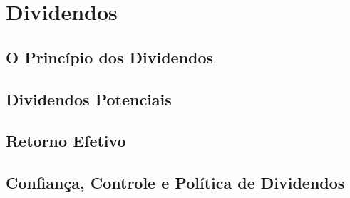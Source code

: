 \chapter{Dividendos}
\section{O Princípio dos Dividendos}

\section{Dividendos Potenciais}

\section{Retorno Efetivo}

\section{Confiança, Controle e Política de Dividendos}
